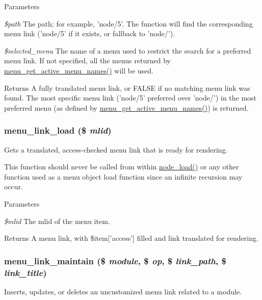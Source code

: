 \begin{DoxyParams}{Parameters}
\item[{\em \$path}]The path; for example, 'node/5'. The function will find the corresponding menu link ('node/5' if it exists, or fallback to 'node/'). \item[{\em \$selected\_\-menu}]The name of a menu used to restrict the search for a preferred menu link. If not specified, all the menus returned by \hyperlink{group__menu_ga421798c040a98ec1b5d583e7a7a5e65b}{menu\_\-get\_\-active\_\-menu\_\-names()} will be used.\end{DoxyParams}
\begin{DoxyReturn}{Returns}
A fully translated menu link, or FALSE if no matching menu link was found. The most specific menu link ('node/5' preferred over 'node/') in the most preferred menu (as defined by \hyperlink{group__menu_ga421798c040a98ec1b5d583e7a7a5e65b}{menu\_\-get\_\-active\_\-menu\_\-names()}) is returned. 
\end{DoxyReturn}
\hypertarget{group__menu_gac2b338fa3a449c826661aade7a7d486e}{
\subsubsection[{menu\_\-link\_\-load}]{\setlength{\rightskip}{0pt plus 5cm}menu\_\-link\_\-load (\$ {\em mlid})}}
\label{group__menu_gac2b338fa3a449c826661aade7a7d486e}
Gets a translated, access-\/checked menu link that is ready for rendering.

This function should never be called from within \hyperlink{node_8module_a492ddfc12843e71242bb484a44e51a19}{node\_\-load()} or any other function used as a menu object load function since an infinite recursion may occur.


\begin{DoxyParams}{Parameters}
\item[{\em \$mlid}]The mlid of the menu item.\end{DoxyParams}
\begin{DoxyReturn}{Returns}
A menu link, with \$item\mbox{[}'access'\mbox{]} filled and link translated for rendering. 
\end{DoxyReturn}
\hypertarget{group__menu_gae3248649fb437dedad940df74fb129dc}{
\subsubsection[{menu\_\-link\_\-maintain}]{\setlength{\rightskip}{0pt plus 5cm}menu\_\-link\_\-maintain (\$ {\em module}, \/  \$ {\em op}, \/  \$ {\em link\_\-path}, \/  \$ {\em link\_\-title})}}
\label{group__menu_gae3248649fb437dedad940df74fb129dc}
Inserts, updates, or deletes an uncustomized menu link related to a module.


